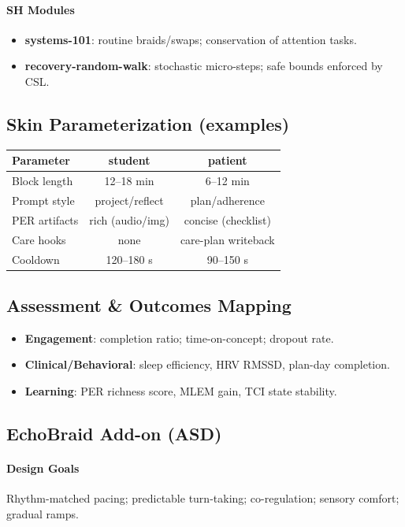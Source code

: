 \documentclass[11pt]{article}
\theoremstyle{plain}
\begin{document}
\paragraph{SH Modules}
\begin{itemize}
  \item \textbf{systems-101}: routine braids/swaps; conservation of attention tasks.
  \item \textbf{recovery-random-walk}: stochastic micro-steps; safe bounds enforced by CSL.
\end{itemize}

\subsection{Skin Parameterization (examples)}
\begin{center}
\begin{tabular}{lcc}
\hline
\textbf{Parameter} & \textbf{student} & \textbf{patient} \\
\hline
Block length & 12--18 min & 6--12 min \\
Prompt style & project/reflect & plan/adherence \\
PER artifacts & rich (audio/img) & concise (checklist) \\
Care hooks & none & care-plan writeback \\
Cooldown & 120--180 s & 90--150 s \\
\hline
\end{tabular}
\end{center}

\subsection{Assessment \& Outcomes Mapping}
\begin{itemize}
  \item \textbf{Engagement}: completion ratio; time-on-concept; dropout rate.
  \item \textbf{Clinical/Behavioral}: sleep efficiency, HRV RMSSD, plan-day completion.
  \item \textbf{Learning}: PER richness score, MLEM gain, TCI state stability.
\end{itemize}

\subsection{EchoBraid Add-on (ASD)}
\paragraph{Design Goals}
Rhythm-matched pacing; predictable turn-taking; co-regulation; sensory comfort; gradual ramps.
\end{document}
